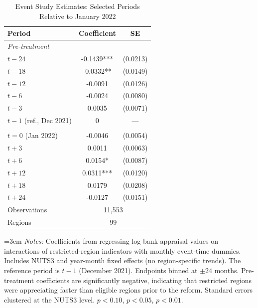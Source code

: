 \begin{table}[htbp]
\centering
\caption{Event Study Estimates: Selected Periods Relative to January 2022}
\label{tab:event_study}
\begin{tabular}{lcc}
\toprule
Period & Coefficient & SE \\
\midrule
\multicolumn{3}{l}{\textit{Pre-treatment}} \\
$t-24$ & -0.1439*** & (0.0213) \\
$t-18$ & -0.0332** & (0.0149) \\
$t-12$ & -0.0091 & (0.0126) \\
$t-6$ & -0.0024 & (0.0080) \\
$t-3$ & 0.0035 & (0.0071) \\
$t-1$ (ref., Dec 2021) & 0 & --- \\
\addlinespace
\multicolumn{3}{l}{\textit{Post-treatment}} \\
$t = 0$ (Jan 2022) & -0.0046 & (0.0054) \\
$t+3$ & 0.0011 & (0.0063) \\
$t+6$ & 0.0154* & (0.0087) \\
$t+12$ & 0.0311*** & (0.0120) \\
$t+18$ & 0.0179 & (0.0208) \\
$t+24$ & -0.0127 & (0.0151) \\
\addlinespace
Observations & \multicolumn{2}{c}{11,553} \\
Regions & \multicolumn{2}{c}{99} \\
\bottomrule
\end{tabular}
\vspace{0.5em}
\begin{minipage}{\textwidth}\emergencystretch=3em
\footnotesize
\textit{Notes:} Coefficients from regressing log bank appraisal values on interactions of restricted-region indicators with monthly event-time dummies. Includes NUTS3 and year-month fixed effects (no region-specific trends). The reference period is $t-1$ (December 2021). Endpoints binned at $\pm 24$ months. Pre-treatment coefficients are significantly negative, indicating that restricted regions were appreciating faster than eligible regions prior to the reform. Standard errors clustered at the NUTS3 level. \sym{*} $p<0.10$, \sym{**} $p<0.05$, \sym{***} $p<0.01$.
\end{minipage}
\end{table}
